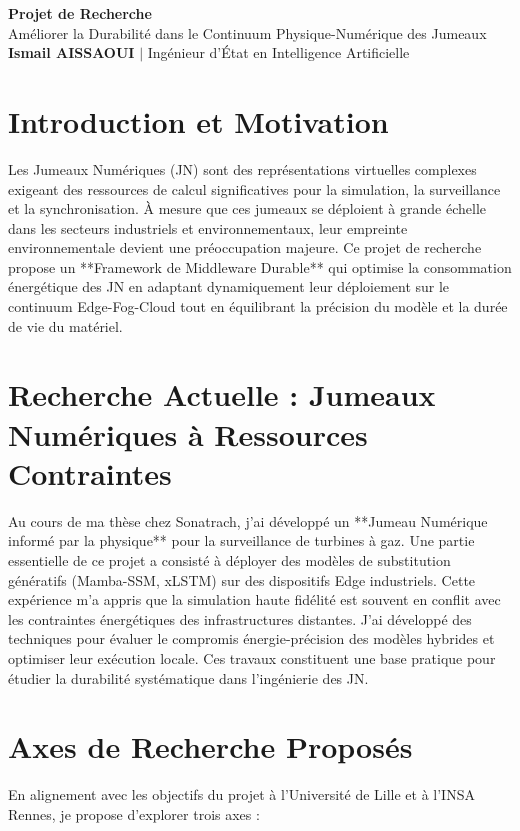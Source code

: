 \documentclass[11pt,a4paper]{article}
\begin{document}
\begin{center}
    {\LARGE\bfseries\color{titleblue} Projet de Recherche}\\[6pt]
    {\large Améliorer la Durabilité dans le Continuum Physique-Numérique des Jumeaux}\\[4pt]
    \textbf{Ismail AISSAOUI} $|$ Ingénieur d'État en Intelligence Artificielle
\end{center}

\bigskip

\section{Introduction et Motivation}
Les Jumeaux Numériques (JN) sont des représentations virtuelles complexes exigeant des ressources de calcul significatives pour la simulation, la surveillance et la synchronisation. À mesure que ces jumeaux se déploient à grande échelle dans les secteurs industriels et environnementaux, leur empreinte environnementale devient une préoccupation majeure. Ce projet de recherche propose un **Framework de Middleware Durable** qui optimise la consommation énergétique des JN en adaptant dynamiquement leur déploiement sur le continuum Edge-Fog-Cloud tout en équilibrant la précision du modèle et la durée de vie du matériel.

\section{Recherche Actuelle : Jumeaux Numériques à Ressources Contraintes}
Au cours de ma thèse chez Sonatrach, j'ai développé un **Jumeau Numérique informé par la physique** pour la surveillance de turbines à gaz. Une partie essentielle de ce projet a consisté à déployer des modèles de substitution génératifs (Mamba-SSM, xLSTM) sur des dispositifs Edge industriels. Cette expérience m'a appris que la simulation haute fidélité est souvent en conflit avec les contraintes énergétiques des infrastructures distantes. J'ai développé des techniques pour évaluer le compromis énergie-précision des modèles hybrides et optimiser leur exécution locale. Ces travaux constituent une base pratique pour étudier la durabilité systématique dans l'ingénierie des JN.

\section{Axes de Recherche Proposés}
En alignement avec les objectifs du projet à l'Université de Lille et à l'INSA Rennes, je propose d'explorer trois axes :
\end{document}
